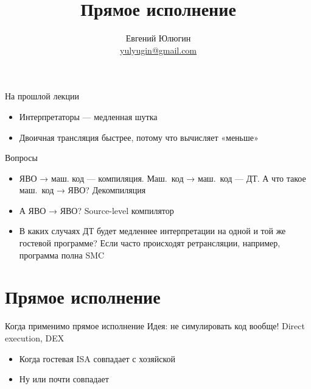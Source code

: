 
\title{Прямое исполнение}
\author[Евгений Юлюгин]{Евгений Юлюгин \\ \small{\href{mailto:yulyugin@gmail.com}{yulyugin@gmail.com}}}



\begin{frame}
    \maketitle
\end{frame}

\begin{frame}
    \tableofcontents
\end{frame}


\begin{frame}{На прошлой лекции}
\begin{itemize}
\item Интерпретаторы — медленная шутка
\item Двоичная трансляция быстрее, потому что вычисляет «меньше»
\end{itemize}
\end{frame}

\begin{frame}{Вопросы}
\begin{itemize}
\item ЯВО → маш. код — компиляция. Маш.~код → маш.~код — ДТ. А что такое маш.~код → ЯВО?\pause{} Декомпиляция\pause
\item А ЯВО → ЯВО?\pause{} Source-level компилятор\pause
\item В каких случаях ДТ будет медленнее интерпретации на одной и той же гостевой программе? \pause Если часто происходят ретрансляции, например, программа полна SMC
\end{itemize}

\end{frame}


\section{Прямое исполнение}

\begin{frame}{Когда применимо прямое исполнение}
Идея: не симулировать код вообще! Direct execution, DEX
\begin{itemize}
\item Когда гостевая ISA совпадает с хозяйской
\item Ну или почти совпадает
\end{itemize}

\end{frame}

